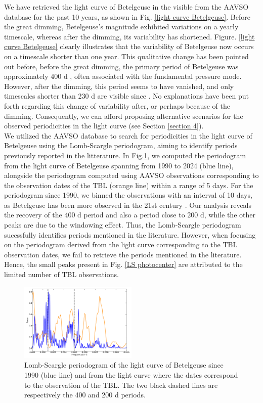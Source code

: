 \documentclass{aa}
\begin{document}
We have retrieved the light curve of Betelgeuse in the visible from the AAVSO database for the past 10 years, as shown in Fig. \ref{light curve Betelgeuse}.
Before the great dimming, Betelgeuse's magnitude exhibited variations on a yearly timescale, whereas after the dimming, its variability has shortened. 
Figure. \ref{light curve Betelgeuse} clearly illustrates that the 
variability of Betelgeuse now occurs on a timescale shorter than one year. This qualitative change has been pointed out before,
before the great dimming, the primary period of Betelgeuse was approximately 400 d \citep{kiss_variability_2006}, often associated with the fundamental pressure mode. However, after the dimming, this period seems to have vanished, and only timescales shorter than 230 d are visible since \citep{dupree_great_2022}. 
No explanations have been put forth regarding this change of variability after, or perhaps because of the dimming. Consequently, we can afford proposing alternative scenarios for the observed periodicities in the light curve (see Section \ref{section 4}).\\


We utilized the AAVSO database to search for periodicities in the light curve of Betelgeuse using the Lomb-Scargle periodogram, aiming to identify periods previously reported in the litterature. In Fig.\ref{Lomb Scargle AAVSO}, we computed the periodogram from the light curve of Betelgeuse spanning from 1990 to 2024 (blue line), alongside the periodogram computed using AAVSO observations corresponding to the observation dates of the TBL (orange line) within a range of 5 days. For the periodogram since 1990, we binned the observations with an interval of 10 days, as Betelgeuse has been more observed in the 21st century \citep{kiss_variability_2006}. Our analysis reveals the recovery of the 400 d period and also a period close to 200 d, while the other peaks are due to the windowing effect. Thus, the Lomb-Scargle periodogram succssfully identifies periods mentioned in the literature. However, when focusing on the periodogram derived from the light curve corresponding to the TBL observation dates, we fail to retrieve the periods mentioned in the literature. Hence, the small peaks present in Fig. \ref{LS photocenter} are attributed to the limited number of TBL observations.

\begin{figure}[!h]
    \centering
    \includegraphics[width=0.5\textwidth]{Lomb-Scargle AAVSO.pdf}
    \caption{Lomb-Scargle periodogram of the light curve of Betelgeuse since 1990 (blue line) and from the light curve where the dates correspond to the observation of the TBL. The two black dashed lines are respectively the 400 and 200 d periods.}
    \label{Lomb Scargle AAVSO}
\end{figure}
\end{document}
